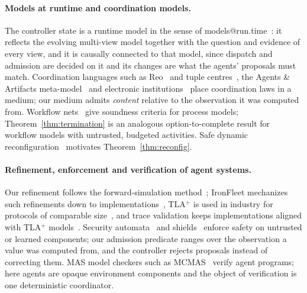 \documentclass[pdflatex,sn-mathphys-num]{sn-jnl}
\theoremstyle{thmstyleone}%
\theoremstyle{thmstyletwo}%
\theoremstyle{thmstylethree}%
\newcommand{\tla}{TLA$^+$}
\begin{document}
\paragraph{Models at runtime and coordination models.} The controller state is a runtime model in the sense of models@run.time~\cite{blair2009mrt,bencomo2019mrt}: it reflects the evolving multi-view model together with the question and evidence of every view, and it is causally connected to that model, since dispatch and admission are decided on it and its changes are what the agents' proposals must match. Coordination languages such as Reo~\cite{arbab2004reo} and tuple centres~\cite{omicini2001tuple}, the Agents \& Artifacts meta-model~\cite{omicini2008artifacts} and electronic institutions~\cite{esteva2001institutions} place coordination laws in a medium; our medium admits \emph{content} relative to the observation it was computed from. Workflow nets~\cite{vanderaalst1998workflow} give soundness criteria for process models; Theorem~\ref{thm:termination} is an analogous option-to-complete result for workflow models with untrusted, budgeted activities. Safe dynamic reconfiguration~\cite{kramer1990evolving} motivates Theorem~\ref{thm:reconfig}.

\paragraph{Refinement, enforcement and verification of agent systems.} Our refinement follows the forward-simulation method~\cite{abadi1991refinement,lynch1995simulations}; IronFleet mechanizes such refinements down to implementations~\cite{ironfleet}, \tla{} is used in industry for protocols of comparable size~\cite{newcombe2015aws}, and trace validation keeps implementations aligned with \tla{} models~\cite{cirstea2024trace,howard2025smartcasual}. Security automata~\cite{schneider} and shields~\cite{shield} enforce safety on untrusted or learned components; our admission predicate ranges over the observation a value was computed from, and the controller rejects proposals instead of correcting them. MAS model checkers such as MCMAS~\cite{lomuscio2017mcmas} verify agent programs; here agents are opaque environment components and the object of verification is one deterministic coordinator.
\end{document}
